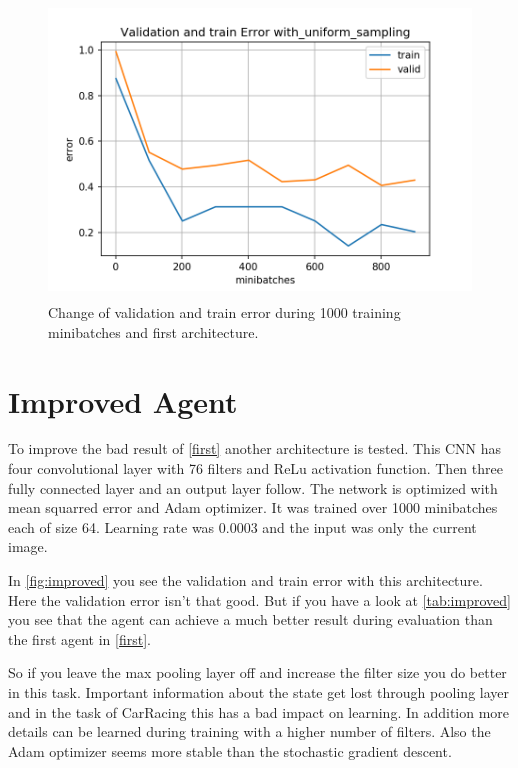 \documentclass[a4paper,12pt]{article}
\begin{document}
\begin{figure}[H]
	\centering \includegraphics[width=11.70cm, height=7.9cm]{plots/valid_error_with_uniform_sampling.png}
	\caption{
		\label{fig:uniform}
		Change of validation and train error during 1000 training minibatches and first architecture.
	}
\end{figure}

\section{Improved Agent}\label{improved}
To improve the bad result of \autoref{first} another architecture is tested. This CNN has four convolutional layer with 76 filters and ReLu activation function. Then three fully connected layer and an output layer follow. The network is optimized with mean squarred error and Adam optimizer. It was trained over 1000 minibatches each of size 64. Learning rate was 0.0003 and the input was only the current image. 

In \autoref{fig:improved} you see the validation and train error with this architecture. Here the validation error isn't that good. But if you have a look at \autoref{tab:improved} you see that the agent can achieve a much better result during evaluation than the first agent in \autoref{first}.

So if you leave the max pooling layer off and increase the filter size you do better in this task. Important information about the state get lost through pooling layer and in the task of CarRacing this has a bad impact on learning. In addition more details can be learned during training with a higher number of filters. Also the Adam optimizer seems more stable than the stochastic gradient descent.\\
\end{document}
